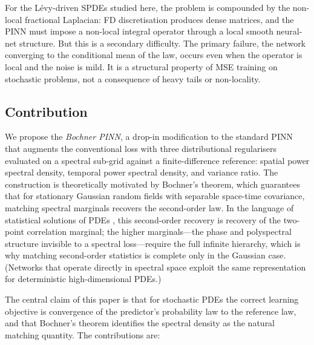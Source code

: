 \documentclass[review,12pt]{elsarticle}
\begin{document}
For the Lévy-driven SPDEs studied here, the problem is compounded by
the non-local fractional Laplacian: FD discretisation produces dense
matrices, and the PINN must impose a non-local integral operator
through a local smooth neural-net structure. But this is a secondary
difficulty. The primary failure, the network converging to the
conditional mean of the law, occurs even when the operator is local
and the noise is mild. It is a structural property of MSE training on
stochastic problems, not a consequence of heavy tails or non-locality.

\subsection{Contribution}
\label{subsec:contribution}

We propose the \emph{Bochner PINN}, a drop-in modification to the
standard PINN that augments the conventional loss with three
distributional regularisers evaluated on a spectral sub-grid against a
finite-difference reference: spatial power spectral density, temporal
power spectral density, and variance ratio. The construction is
theoretically motivated by Bochner's theorem, which guarantees that
for stationary Gaussian random fields with separable space-time
covariance, matching spectral marginals recovers the second-order law.
In the language of statistical solutions of PDEs \cite{FjordholmLanthalerMishra2017},
this second-order recovery is recovery of the two-point correlation marginal;
the higher marginals---the phase and polyspectral structure invisible to a
spectral loss---require the full infinite hierarchy, which is why matching
second-order statistics is complete only in the Gaussian case. (Networks that
operate directly in spectral space \cite{YuOseledets2026} exploit the same
representation for deterministic high-dimensional PDEs.)

The central claim of this paper is that for stochastic PDEs the
correct learning objective is convergence of the predictor's
probability law to the reference law, and that Bochner's theorem
identifies the spectral density as the natural matching quantity.
The contributions are:
\end{document}
